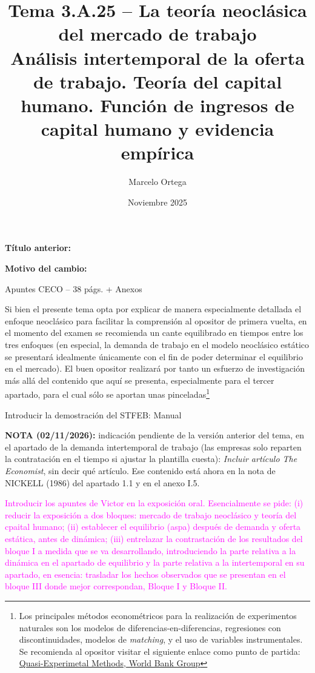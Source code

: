 \documentclass[10pt,a4paper]{article}
\title{Tema 3.A.25 -- La teoría neoclásica del mercado de trabajo\\
\large Análisis intertemporal de la oferta de trabajo. Teoría del capital humano. Función de ingresos de capital humano y evidencia empírica}
\author{Marcelo Ortega}
\date{Noviembre 2025}
\newcommand{\puntosclave}[1]{%
  \begin{tcolorbox}[
    colframe=black,
    title={Puntos clave},
    before upper={\setlength{\parindent}{0.5cm}\setlength{\parskip}{0.5\baselineskip}}
  ]
  #1
  \end{tcolorbox}
}
\newcommand{\modificaciones}[1]{
  \begin{tcolorbox}[
    colback=white,
    colframe=red,
    title={Modificaciones a realizar},
    before upper={\setlength{\parindent}{0.5cm}\setlength{\parskip}{0.5\baselineskip}}
  ]
  #1
  \end{tcolorbox}
}
\newcommand{\changebox}{%
\begin{tcolorbox}[title={Historial de cambios del tema}]
\textbf{Título anterior:} \OldTitle\par
\textbf{Motivo del cambio:} \ChangeWhy
\end{tcolorbox}
}
\newcounter{anexo}
\begin{document}
\maketitle
\changebox

\newpage

\puntosclave{ %
    Apuntes CECO -- 38 págs. + Anexos 

    Si bien el presente tema opta por explicar de manera especialmente detallada el enfoque neoclásico para facilitar la comprensión al opositor de primera vuelta, en el momento del examen se recomienda un cante equilibrado en tiempos entre los tres enfoques (en especial, la demanda de trabajo en el modelo neoclásico estático se presentará idealmente únicamente con el fin de poder determinar el equilibrio en el mercado). El buen opositor realizará por tanto un esfuerzo de investigación más allá del contenido que aquí se presenta, especialmente para el tercer apartado, para el cual sólo se aportan unas pinceladas\footnote{%
    Los principales métodos econométricos para la realización de experimentos naturales son los modelos de diferencias-en-diferencias, regresiones con discontinuidades, modelos de \textit{matching}, y el uso de variables instrumentales. Se
recomienda al opositor visitar el siguiente enlace como punto de partida: \href{https://dimewiki.worldbank.org/Quasi-Experimental_Methods}{Quasi-Experimetal Methods, World Bank Group}
}}
\vspace{1cm}

\modificaciones{
    Introducir la demostración del STFEB: Manual 

    \textbf{NOTA (02/11/2026):} indicación pendiente de la versión anterior del tema, en el apartado de la demanda intertemporal de trabajo (las empresas solo reparten la contratación en el tiempo si ajustar la plantilla cuesta): \textit{Incluir artículo The Economist}, sin decir qué artículo. Ese contenido está ahora en la nota de NICKELL (1986) del apartado 1.1 y en el anexo I.5.


    \textcolor{magenta}{Introducir los apuntes de Victor en la exposición oral. Esencialmente se pide: (i) reducir la exposición a dos bloques: mercado de trabajo neoclásico y teoría del cpaital humano; (ii) establecer el equilibrio (aspa) después de demanda y oferta estática, antes de dinámica; (iii) entrelazar la contrastación de los resultados del bloque I a medida que se va desarrollando, introduciendo la parte relativa a la dinámica en el apartado de equilibrio y la parte relativa a la intertemporal en su apartado, en esencia: trasladar los hechos observados que se presentan en el bloque III donde mejor correspondan, Bloque I y Bloque II.}
    }
\end{document}
